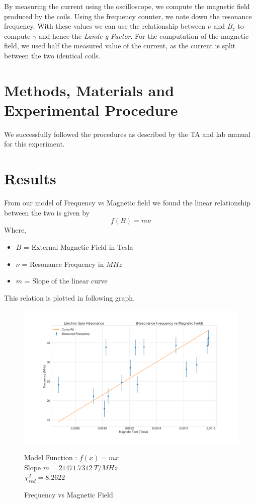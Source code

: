 \documentclass[letterpaper,12pt]{article}
\begin{document}
By measuring the current using the oscilloscope, we compute the magnetic field produced by the coils. Using the frequency counter, we note down the
resonance frequency. With these values we can use the relationship between $\nu$ and $B_z$ to compute $\gamma$ and hence the 
\emph{Lande g Factor}. For the computation of the magnetic field, we used half the measured value of the current, as the current is split between 
the two identical coils.

\section{Methods, Materials and Experimental Procedure}

We successfully followed the procedures as described by the TA and lab manual \cite{lab-manual-ex6} for this experiment.

\section{Results}

From our model of Frequency vs Magnetic field we found the linear relationship between the two is given 
by 
$$f(B) = m\nu$$
Where,
\begin{itemize}
  \item[] $B$ = External Magnetic Field in Tesla
  \item[] $\nu$ = Resonance Frequency in $MHz$
  \item[] $m$ = Slope of the linear curve 
\end{itemize}

This relation is plotted in following graph,

\begin{figure}[H]
  \centering
  \includegraphics[width=0.95\linewidth]{../code/Pankaj/lab6_freq_vs_magnetic_field.png}    
  \begin{center}
    \begin{center}
      Model Function : $f(x) = mx$ \\
      Slope $m = 21471.7312\ T/MHz$\\
      $\chi_{red}^2 = 8.2622$
    \end{center}  \end{center}
  \caption{Frequency vs Magnetic Field}
  \label{frq-vs-b}
\end{figure}
\end{document}
